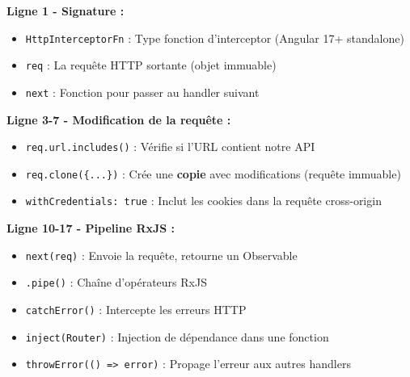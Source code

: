 \documentclass[12pt,a4paper]{article}
\begin{document}
\begin{infobox}[title={\faLightbulb\ Explication Détaillée de l'Interceptor}]
\textbf{Ligne 1 - Signature :}
\begin{itemize}
    \item \texttt{HttpInterceptorFn} : Type fonction d'interceptor (Angular 17+ standalone)
    \item \texttt{req} : La requête HTTP sortante (objet immuable)
    \item \texttt{next} : Fonction pour passer au handler suivant
\end{itemize}

\textbf{Ligne 3-7 - Modification de la requête :}
\begin{itemize}
    \item \texttt{req.url.includes()} : Vérifie si l'URL contient notre API
    \item \texttt{req.clone(\{...\})} : Crée une \textbf{copie} avec modifications (requête immuable)
    \item \texttt{withCredentials: true} : Inclut les cookies dans la requête cross-origin
\end{itemize}

\textbf{Ligne 10-17 - Pipeline RxJS :}
\begin{itemize}
    \item \texttt{next(req)} : Envoie la requête, retourne un Observable
    \item \texttt{.pipe()} : Chaîne d'opérateurs RxJS
    \item \texttt{catchError()} : Intercepte les erreurs HTTP
    \item \texttt{inject(Router)} : Injection de dépendance dans une fonction
    \item \texttt{throwError(() => error)} : Propage l'erreur aux autres handlers
\end{itemize}
\end{infobox}
\end{document}
